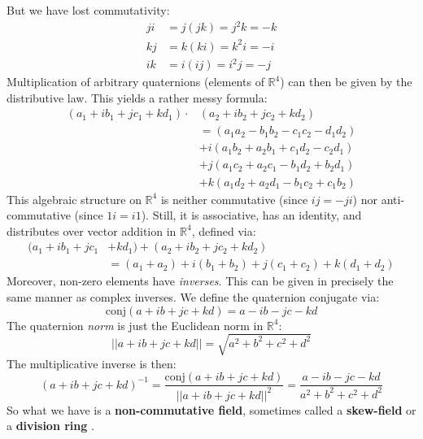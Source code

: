\documentclass{article}
\begin{document}
       But we have lost commutativity:
        \begin{align}
            ji&=j(jk)=j^{2}k=-k\\
            kj&=k(ki)=k^{2}i=-i\\
            ik&=i(ij)=i^{2}j=-j
        \end{align}
        Multiplication of arbitrary quaternions (elements of $\mathbb{R}^{4}$)
        can then be given by the distributive law. This yields a rather
        messy formula:
        \begin{align}
            (a_{1}+ib_{1}+jc_{1}+kd_{1})\cdot&(a_{2}+ib_{2}+jc_{2}+kd_{2})
            \nonumber\\
            &=(a_{1}a_{2}-b_{1}b_{2}-c_{1}c_{2}-d_{1}d_{2})\nonumber\\
            &+i(a_{1}b_{2}+a_{2}b_{1}+c_{1}d_{2}-c_{2}d_{1})\nonumber\\
            &+j(a_{1}c_{2}+a_{2}c_{1}-b_{1}d_{2}+b_{2}d_{1})\nonumber\\
            &+k(a_{1}d_{2}+a_{2}d_{1}-b_{1}c_{2}+c_{1}b_{2})
        \end{align}
        This algebraic structure on $\mathbb{R}^{4}$ is neither commutative
        (since $ij=-ji$) nor anti-commutative (since $1i=i1$). Still, it is
        associative, has an identity, and distributes over vector addition
        in $\mathbb{R}^{4}$, defined via:
        \begin{align}
            (a_{1}+ib_{1}+jc_{1}&+kd_{1})+(a_{2}+ib_{2}+jc_{2}+kd_{2})
            \nonumber\\
            &=(a_{1}+a_{2})+i(b_{1}+b_{2})+j(c_{1}+c_{2})+k(d_{1}+d_{2})
        \end{align}
        Moreover, non-zero elements have \textit{inverses}. This can be
        given in precisely the same manner as complex inverses. We define the
        quaternion conjugate via:
        \begin{equation}
            \textrm{conj}(a+ib+jc+kd)=a-ib-jc-kd
        \end{equation}
        The quaternion \textit{norm} is just the Euclidean norm in
        $\mathbb{R}^{4}$:
        \begin{equation}
            ||a+ib+jc+kd||=\sqrt{a^{2}+b^{2}+c^{2}+d^{2}}
        \end{equation}
        The multiplicative inverse is then:
        \begin{equation}
            (a+ib+jc+kd)^{-1}
            =\frac{\textrm{conj}(a+ib+jc+kd)}{||a+ib+jc+kd||^{2}}
            =\frac{a-ib-jc-kd}{a^{2}+b^{2}+c^{2}+d^{2}}
        \end{equation}
        So what we have is a \textbf{non-commutative field}, sometimes called a
        \textbf{skew-field} or a \textbf{division ring}
        \cite[p. 4]{LamNonCommutativeRings}.
\end{document}
